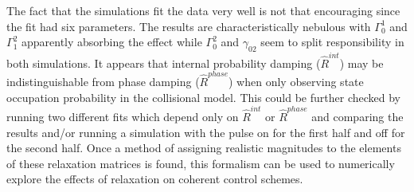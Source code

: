 The fact that the simulations fit the data very well is not that encouraging since the fit had six parameters. The results are characteristically nebulous with $\Gamma^{1}_{0}$ and $\Gamma^{2}_{1}$ apparently absorbing the effect while $\Gamma^{2}_{0}$ and $\gamma_{02}$ seem to split responsibility in both simulations. It appears that internal probability damping ($\hat{R}^{int}$) may be indistinguishable from phase damping ($\hat{R}^{phase}$) when only observing state occupation probability in the collisional model. This could be further checked by running two different fits which depend only on $\hat{R}^{int}$ or $\hat{R}^{phase}$ and comparing the results and/or running a simulation with the pulse on for the first half and off for the second half. Once a method of assigning realistic magnitudes to the elements of these relaxation matrices is found, this formalism can be used to numerically explore the effects of relaxation on coherent control schemes.
